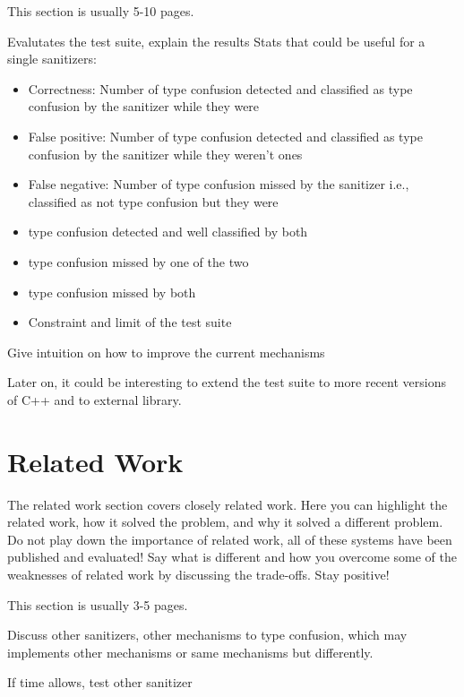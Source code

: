 \documentclass[a4paper,11pt,oneside]{report}
\begin{document}
This section is usually 5-10 pages.

Evalutates the test suite, explain the results
Stats that could be useful for a single sanitizers:
\begin{itemize}
       \item Correctness: Number of type confusion detected and classified as type confusion by the sanitizer while they were
       \item False positive: Number of type confusion detected and classified as type confusion by the sanitizer while they weren't ones
       \item False negative: Number of type confusion missed by the sanitizer i.e., classified as not type confusion but they were

       \item type confusion detected and well classified by both
       \item type confusion missed by one of the two
       \item type confusion missed by both

       \item Constraint and limit of the test suite

\end{itemize}

Give intuition on how to improve the current mechanisms

Later on,
it could be interesting to extend the test suite to more recent versions of C++
and to external library. 

\chapter{Related Work}

The related work section covers closely related work. Here you can highlight
the related work, how it solved the problem, and why it solved a different
problem. Do not play down the importance of related work, all of these
systems have been published and evaluated! Say what is different and how
you overcome some of the weaknesses of related work by discussing the 
trade-offs. Stay positive!

This section is usually 3-5 pages.

Discuss other sanitizers, other mechanisms to type confusion,
which may implements other mechanisms or same mechanisms but differently.

If time allows, test other sanitizer
\end{document}
